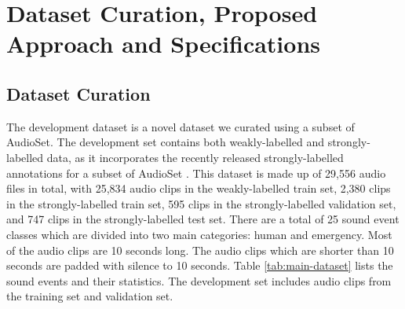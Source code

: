 \linespread{1.3}
\chapter{Dataset Curation, Proposed Approach and Specifications}

\section{Dataset Curation}
The development dataset is a novel dataset we curated using a subset of AudioSet. The development set contains both weakly-labelled and strongly-labelled data, as it incorporates the recently released strongly-labelled annotations for a subset of AudioSet \cite{hershey2021benefit}. This dataset is made up of 29,556 audio files in total, with 25,834 audio clips in the weakly-labelled train set, 2,380 clips in the strongly-labelled train set, 595 clips in the strongly-labelled validation set, and 747 clips in the strongly-labelled test set. There are a total of 25 sound event classes which are divided into two main categories: human and emergency. Most of the audio clips are 10 seconds long. The audio clips which are shorter than 10 seconds are padded with silence to 10 seconds. Table \ref{tab:main-dataset} lists the sound events and their statistics. The development set includes audio clips from the training set and validation set.\\

